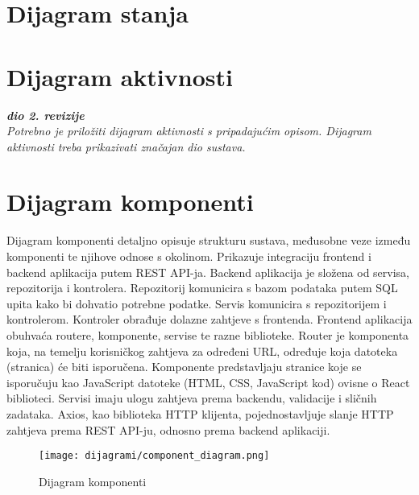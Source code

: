 			\eject
		
		\section{Dijagram stanja}
			
			
			

            
			
			\eject 
		
		\section{Dijagram aktivnosti}
			
			\textbf{\textit{dio 2. revizije}}\\
			
			 \textit{Potrebno je priložiti dijagram aktivnosti s pripadajućim opisom. Dijagram aktivnosti treba prikazivati značajan dio sustava.}
			
			\eject
		\section{Dijagram komponenti}

            Dijagram komponenti detaljno opisuje strukturu sustava, međusobne veze između komponenti te njihove odnose s okolinom. Prikazuje integraciju frontend i backend aplikacija putem REST API-ja. Backend aplikacija je složena od servisa, repozitorija i kontrolera. Repozitorij komunicira s bazom podataka putem SQL upita kako bi dohvatio potrebne podatke. Servis komunicira s repozitorijem i kontrolerom. Kontroler obrađuje dolazne zahtjeve s frontenda. Frontend aplikacija obuhvaća routere, komponente, servise te razne biblioteke. Router je komponenta koja, na temelju korisničkog zahtjeva za određeni URL, određuje koja datoteka (stranica) će biti isporučena. Komponente predstavljaju stranice koje se isporučuju kao JavaScript datoteke (HTML, CSS, JavaScript kod) ovisne o React biblioteci. Servisi imaju ulogu zahtjeva prema backendu, validacije i sličnih zadataka. Axios, kao biblioteka HTTP klijenta, pojednostavljuje slanje HTTP zahtjeva prema REST API-ju, odnosno prema backend aplikaciji.
    
			    \begin{figure}[H]
			         \texttt{[image: dijagrami/component\_diagram.png]}
			         \centering
			         \caption{Dijagram komponenti}
			         \label{fig:component_diagram}
		        \end{figure}